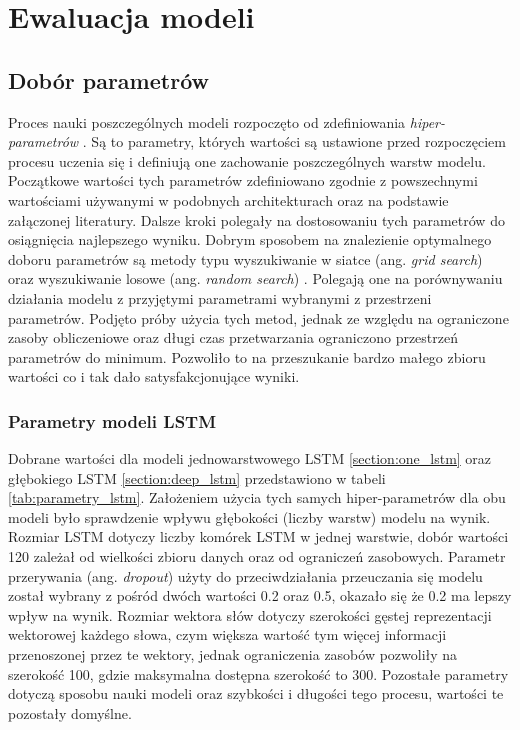\chapter{Ewaluacja modeli}

\section{Dobór parametrów}

Proces nauki poszczególnych modeli rozpoczęto od zdefiniowania \textit{hiper-parametrów} \cite{probst2018tunability}. Są to parametry, których wartości są ustawione przed rozpoczęciem procesu uczenia się i definiują one zachowanie poszczególnych warstw modelu. Początkowe wartości tych parametrów zdefiniowano zgodnie z powszechnymi wartościami używanymi w podobnych architekturach oraz na podstawie załączonej literatury. Dalsze kroki polegały na dostosowaniu tych parametrów do osiągnięcia najlepszego wyniku. Dobrym sposobem na znalezienie optymalnego doboru parametrów są metody typu wyszukiwanie w siatce (ang. \textit{grid search}) oraz wyszukiwanie losowe (ang. \textit{random search}) \cite{liashchynskyi2019grid}. Polegają one na porównywaniu działania modelu z przyjętymi parametrami wybranymi z przestrzeni parametrów. Podjęto próby użycia tych metod, jednak ze względu na ograniczone zasoby obliczeniowe oraz długi czas przetwarzania ograniczono przestrzeń parametrów do minimum. Pozwoliło to na przeszukanie bardzo małego zbioru wartości co i tak dało satysfakcjonujące wyniki.

\subsection{Parametry modeli LSTM}

Dobrane wartości dla modeli jednowarstwowego LSTM \ref{section:one_lstm} oraz głębokiego LSTM \ref{section:deep_lstm} przedstawiono w tabeli \ref{tab:parametry_lstm}. Założeniem użycia tych samych hiper-parametrów dla obu modeli było sprawdzenie wpływu głębokości (liczby warstw) modelu na wynik. Rozmiar LSTM dotyczy liczby komórek LSTM w jednej warstwie, dobór wartości 120 zależał od wielkości zbioru danych oraz od ograniczeń zasobowych. Parametr przerywania (ang. \textit{dropout}) użyty do przeciwdziałania przeuczania się modelu został wybrany z pośród dwóch wartości 0.2 oraz 0.5, okazało się że 0.2 ma lepszy wpływ na wynik. Rozmiar wektora słów dotyczy szerokości gęstej reprezentacji wektorowej każdego słowa, czym większa wartość tym więcej informacji przenoszonej przez te wektory, jednak ograniczenia zasobów pozwoliły na szerokość 100, gdzie maksymalna dostępna szerokość to 300. Pozostałe parametry dotyczą sposobu nauki modeli oraz szybkości i długości tego procesu, wartości te pozostały domyślne.

